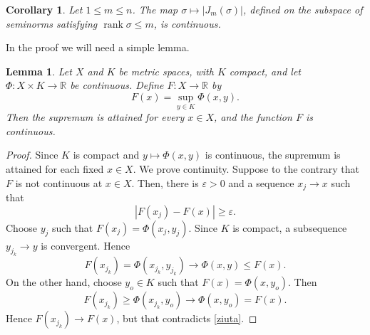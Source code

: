 \documentclass[12pt,leqno]{amsart}
\newtheorem{lemma}[theorem]{Lemma}
\newtheorem{corollary}[theorem]{Corollary}
\theoremstyle{definition}
\newcommand{\eps}{\varepsilon}
\numberwithin{theorem}{section} \numberwithin{equation}{section}
\begin{document}
\begin{corollary}
\label{SJT6}
Let $1\leq m\leq n$. The map $\sigma\mapsto |J_m(\sigma)|$, defined on the subspace of
seminorms satisfying $\operatorname{rank}\sigma\leq m$, is continuous.
\end{corollary}
In the proof we will need a simple lemma.
\begin{lemma}
\label{SJT8}
Let $X$ and $K$ be metric spaces, with $K$ compact, and let
$\Phi\colon X\times K\to \mathbb R$ be continuous. Define
$F\colon X\to\mathbb R$ by
\[
F(x)=\sup_{y\in K}\Phi(x,y).
\]
Then the supremum is attained for every $x\in X$, and the function $F$ is continuous.
\end{lemma}
\begin{proof}
Since $K$ is compact and $y\mapsto \Phi(x,y)$ is continuous, the supremum is
attained for each fixed $x\in X$.
We prove continuity.
Suppose to the contrary that $F$ is not continuous at $x\in X$. Then, there is $\eps>0$ and a sequence $x_j\to x$ such that
\begin{equation}
\label{ziuta}
|F(x_{j})-F(x)|\geq \eps.
\end{equation}
Choose $y_j$ such that $F(x_j)=\Phi(x_j,y_j)$. Since $K$ is compact, a subsequence $y_{j_k}\to y$ is convergent. Hence
$$
F(x_{j_k})=\Phi(x_{j_k},y_{j_k})\to\Phi(x,y)\leq F(x).
$$
On the other hand, choose $y_o\in K$ such that $F(x)=\Phi(x,y_o)$. Then
$$
F(x_{j_k})\geq\Phi(x_{j_k},y_o)\to\Phi(x,y_o)=F(x).
$$
Hence $F(x_{j_k})\to F(x)$, but that contradicts \eqref{ziuta}.
\end{proof}
\end{document}
